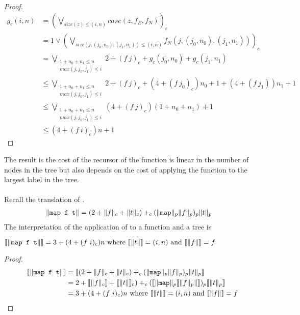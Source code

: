 \begin{proof}
\begin{align*}
  g_c(i,n) &= (\bigvee\limits_{size(z) \leq (i,n)} case(z,f_E,f_N))_c \\
           &= 1 \vee (\bigvee\limits_{size(j,(j_0,n_0),(j_1,n_1)) \leq (i,n)} f_N(j,(j_0,n_0),(j_1,n_1)))_c \\
           &= \bigvee\limits_{\substack{1 + n_0 + n_1 \leq n\\max(j,j_0,j_1)\leq i}} 2 + (f\ j)_c + g_c(j_0,n_0) + g_c(j_1,n_1) \\
           &\leq \bigvee\limits_{\substack{1 + n_0 + n_1 \leq n\\max(j,j_0,j_1)\leq i}} 2 + (f\ j)_c + (4 + (f\ j_0)_c)n_0 + 1 + (4 + (f\ j_1))n_1 + 1\\
           &\leq \bigvee\limits_{\substack{1 + n_0 + n_1 \leq n\\max(j,j_0,j_1)\leq i}} (4 + (f\ j)_c)(1 + n_0 + n_1) + 1\\
           &\leq (4 + (f\ i)_c)n + 1
\end{align*}
\end{proof}
%
The result is the cost of the recursor of the  function is linear in the
number of nodes in the tree but also depends on the cost of applying the
function to the largest label in the tree.

\paragraph{}
Recall the translation of .
%
\begin{align*}
  \|\texttt{map f t}\| &= (2 + \|f\|_c + \|t\|_c) +_c (\|\texttt{map}\|_p \|f\|_p)_p \|t\|_p
\end{align*}
%
The interpretation of the application of  to a function  and a tree  is
%
\begin{lemma}
  \label{lem:treemap_cost}
  $\llbracket\|\texttt{map f t}\|\rrbracket = 3 + (4 + (f\ i)_c)n \text{ where } \llbracket\|t\|\rrbracket = (i,n) \text{ and } \llbracket\|f\|\rrbracket = f$
\end{lemma}
\begin{proof}
\begin{align*}
  \llbracket\|\texttt{map f t}\|\rrbracket &= \llbracket(2 + \|f\|_c + \|t\|_c) +_c (\|\texttt{map}\|_p \|f\|_p)_p \|t\|_p\rrbracket \\
                        &= 2 + \llbracket\|f\|_c\rrbracket + \llbracket\|t\|\rrbracket_c) +_c (\llbracket\|\texttt{map}\|_p \llbracket\|f\|_p\|\rrbracket)_p \llbracket\|t\|_p\rrbracket \\
                        &= 3 + (4 + (f\ i)_c)n \text{ where } \llbracket\|t\|\rrbracket = (i,n) \text{ and } \llbracket\|f\|\rrbracket = f
\end{align*}
\end{proof}
%
